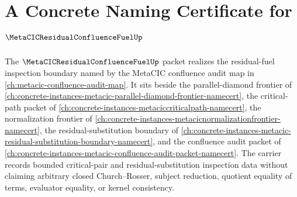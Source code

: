 \chapter{A Concrete Naming Certificate for $\MetaCICResidualConfluenceFuelUp$}
\label{ch:concrete-instances-metacic-residual-confluence-fuel-namecert}

The $\MetaCICResidualConfluenceFuelUp$ packet realizes the residual-fuel inspection boundary named by the MetaCIC confluence audit map in \autoref{ch:metacic-confluence-audit-map}. It sits beside the parallel-diamond frontier of \autoref{ch:concrete-instances-metacic-parallel-diamond-frontier-namecert}, the critical-path packet of \autoref{ch:concrete-instances-metaciccriticalpath-namecert}, the normalization frontier of \autoref{ch:concrete-instances-metacicnormalizationfrontier-namecert}, the residual-substitution boundary of \autoref{ch:concrete-instances-metacic-residual-substitution-boundary-namecert}, and the confluence audit packet of \autoref{ch:concrete-instances-metacic-confluence-audit-packet-namecert}. The carrier records bounded critical-pair and residual-substitution inspection data without claiming arbitrary closed Church--Rosser, subject reduction, quotient equality of terms, evaluator equality, or kernel consistency.

